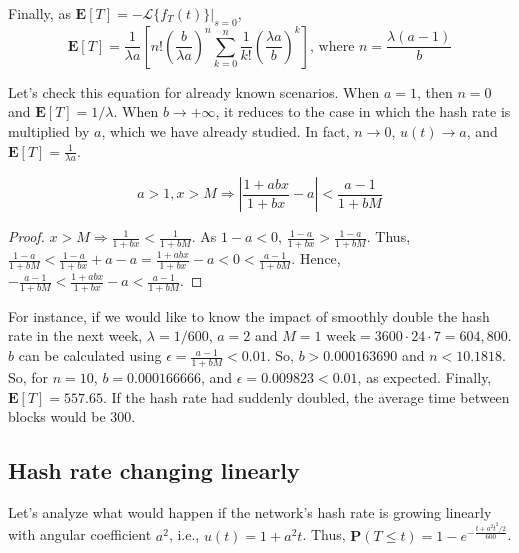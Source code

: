 Finally, as $\mathbf{E}[T] = -\mathcal{L}\{f_T(t)\}|_{s=0}$,
$$\mathbf{E}[T] = \frac{1}{\lambda a} \left[ n! \left(\frac{b}{\lambda a}\right)^n \sum_{k=0}^n \frac{1}{k!} \left( \frac{\lambda a}{b} \right)^{k} \right] \text{, where $n = \frac{\lambda(a-1)}{b}$}$$

Let's check this equation for already known scenarios. When $a=1$, then $n=0$ and $\mathbf{E}[T] = 1/\lambda$. When $b \rightarrow +\infty$, it reduces to the case in which the hash rate is multiplied by $a$, which we have already studied. In fact, $n \rightarrow 0$, $u(t) \rightarrow a$, and $\mathbf{E}[T] = \frac{1}{\lambda a}$.

\begin{theorem}
	$$a > 1, x > M \Rightarrow \left| \frac{1+abx}{1+bx} - a \right| < \frac{a-1}{1+bM}$$
\end{theorem}
\begin{proof}
$x > M \Rightarrow \frac{1}{1+bx} < \frac{1}{1+bM}$. As $1-a<0$, $\frac{1-a}{1+bx} > \frac{1-a}{1+bM}$. Thus, $\frac{1-a}{1+bM} < \frac{1-a}{1+bx} + a - a = \frac{1+abx}{1+bx} - a < 0 < \frac{a-1}{1+bM}$. Hence, $-\frac{a-1}{1+bM} < \frac{1+abx}{1+bx} - a < \frac{a-1}{1+bM}$.
\end{proof}

For instance, if we would like to know the impact of smoothly double the hash rate in the next week, $\lambda = 1/600$, $a=2$ and $M=1\text{ week}=3600\cdot24\cdot7 = 604,800$. $b$ can be calculated using $\epsilon = \frac{a-1}{1+bM} < 0.01$. So, $b > 0.000163690$ and $n<10.1818$. So, for $n=10$, $b=0.000166666$, and $\epsilon = 0.009823 < 0.01$, as expected. Finally, $\mathbf{E}[T] = 557.65$. If the hash rate had suddenly doubled, the average time between blocks would be 300.





\subsection{Hash rate changing linearly}

Let's analyze what would happen if the network's hash rate is growing linearly with angular coefficient $a^2$, i.e., $u(t) = 1 + a^2t$. Thus, $\mathbf{P}(T \leq t) = 1 - e^{-\frac{t + a^2t^2/2}{600}}$.

